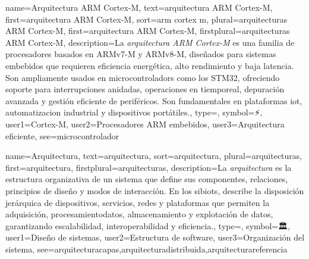	{
		name={Arquitectura ARM Cortex-M},
		text={arquitectura ARM Cortex-M},
		first={arquitectura ARM Cortex-M},
		sort={arm cortex m},
		plural={arquitecturas ARM Cortex-M},
		first={arquitectura ARM Cortex-M},
		firstplural={arquitecturas ARM Cortex-M},
		description={La \emph{arquitectura ARM Cortex-M} es una familia de procesadores basados en ARMv7-M y ARMv8-M, dise{\~n}ados para sistemas embebidos que requieren eficiencia energ{\'e}tica, alto rendimiento y baja \gls{latencia}. Son ampliamente usados en \glspl{microcontrolador} como los STM32, ofreciendo soporte para interrupciones anidadas, operaciones en \gls{tiemporeal}, depuraci{\'o}n avanzada y gesti{\'o}n eficiente de perif{\'e}ricos. Son fundamentales en plataformas \gls{iot}, \gls{automatizacion} industrial y dispositivos port{\'a}tiles.},
		type=\glsdefaulttype,
		symbol={⚡},
		user1={Cortex-M},
		user2={Procesadores ARM embebidos},
		user3={Arquitectura eficiente},
		see={microcontrolador}
	}
	
	{
		name={Arquitectura},
		text={arquitectura},
		sort={arquitectura},
		plural={arquitecturas},
		first={arquitectura},
		firstplural={arquitecturas},
		description={La \emph{arquitectura} es la estructura organizativa de un sistema que define sus componentes, relaciones, principios de dise{\~n}o y modos de interacci{\'o}n. En los \glspl{sibiot}, describe la disposici{\'o}n jer{\'a}rquica de \glspl{dispositivo}, servicios, redes y plataformas que permiten la adquisici{\'o}n, \gls{procesamientodatos}, almacenamiento y explotaci{\'o}n de \glspl{dato}, garantizando \gls{escalabilidad}, \gls{interoperabilidad} y eficiencia.},
		type=\glsdefaulttype,
		symbol={🏛️},
		user1={Dise{\~n}o de sistemas},
		user2={Estructura de software},
		user3={Organizaci{\'o}n del sistema},
		see={arquitecturacapas,arquitecturadistribuida,arquitecturareferencia}
	}
	
	
